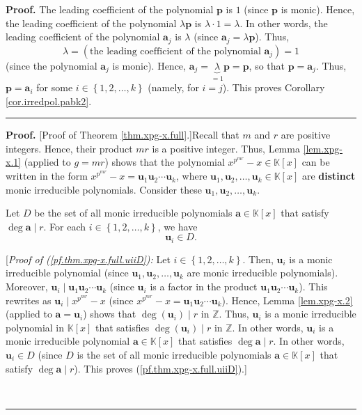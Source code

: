 \documentclass[numbers=enddot,12pt,final,onecolumn,notitlepage]{scrartcl}%
\theoremstyle{definition}
\newenvironment{proof}[1][Proof]{\noindent\textbf{#1.} }{\ \rule{0.5em}{0.5em}}
\begin{document}
\begin{proof}
The leading coefficient of the polynomial $\mathbf{p}$ is $1$ (since
$\mathbf{p}$ is monic). Hence, the leading coefficient of the polynomial
$\lambda\mathbf{p}$ is $\lambda\cdot1=\lambda$. In other words, the leading
coefficient of the polynomial $\mathbf{a}_{j}$ is $\lambda$ (since
$\mathbf{a}_{j}=\lambda\mathbf{p}$). Thus,%
\[
\lambda=\left(  \text{the leading coefficient of the polynomial }%
\mathbf{a}_{j}\right)  =1
\]
(since the polynomial $\mathbf{a}_{j}$ is monic). Hence, $\mathbf{a}%
_{j}=\underbrace{\lambda}_{=1}\mathbf{p}=\mathbf{p}$, so that $\mathbf{p}%
=\mathbf{a}_{j}$. Thus, $\mathbf{p}=\mathbf{a}_{i}$ for some $i\in\left\{
1,2,\ldots,k\right\}  $ (namely, for $i=j$). This proves Corollary
\ref{cor.irredpol.pabk2}.
\end{proof}

\begin{proof}
[Proof of Theorem \ref{thm.xpg-x.full}.]Recall that $m$ and $r$ are positive
integers. Hence, their product $mr$ is a positive integer. Thus, Lemma
\ref{lem.xpg-x.1} (applied to $g=mr$) shows that the polynomial $x^{p^{mr}%
}-x\in\mathbb{K}\left[  x\right]  $ can be written in the form $x^{p^{mr}%
}-x=\mathbf{u}_{1}\mathbf{u}_{2}\cdots\mathbf{u}_{k}$, where $\mathbf{u}%
_{1},\mathbf{u}_{2},\ldots,\mathbf{u}_{k}\in\mathbb{K}\left[  x\right]  $ are
\textbf{distinct} monic irreducible polynomials. Consider these $\mathbf{u}%
_{1},\mathbf{u}_{2},\ldots,\mathbf{u}_{k}$.

Let $D$ be the set of all monic irreducible polynomials $\mathbf{a}%
\in\mathbb{K}\left[  x\right]  $ that satisfy $\deg\mathbf{a}\mid r$. For each
$i\in\left\{  1,2,\ldots,k\right\}  $, we have%
\begin{equation}
\mathbf{u}_{i}\in D. \label{pf.thm.xpg-x.full.uiiD}%
\end{equation}


[\textit{Proof of (\ref{pf.thm.xpg-x.full.uiiD}):} Let $i\in\left\{
1,2,\ldots,k\right\}  $. Then, $\mathbf{u}_{i}$ is a monic irreducible
polynomial (since $\mathbf{u}_{1},\mathbf{u}_{2},\ldots,\mathbf{u}_{k}$ are
monic irreducible polynomials). Moreover, $\mathbf{u}_{i}\mid\mathbf{u}%
_{1}\mathbf{u}_{2}\cdots\mathbf{u}_{k}$ (since $\mathbf{u}_{i}$ is a factor in
the product $\mathbf{u}_{1}\mathbf{u}_{2}\cdots\mathbf{u}_{k}$). This rewrites
as $\mathbf{u}_{i}\mid x^{p^{mr}}-x$ (since $x^{p^{mr}}-x=\mathbf{u}%
_{1}\mathbf{u}_{2}\cdots\mathbf{u}_{k}$). Hence, Lemma \ref{lem.xpg-x.2}
(applied to $\mathbf{a}=\mathbf{u}_{i}$) shows that $\deg\left(
\mathbf{u}_{i}\right)  \mid r$ in $\mathbb{Z}$. Thus, $\mathbf{u}_{i}$ is a
monic irreducible polynomial in $\mathbb{K}\left[  x\right]  $ that satisfies
$\deg\left(  \mathbf{u}_{i}\right)  \mid r$ in $\mathbb{Z}$. In other words,
$\mathbf{u}_{i}$ is a monic irreducible polynomial $\mathbf{a}\in
\mathbb{K}\left[  x\right]  $ that satisfies $\deg\mathbf{a}\mid r$. In other
words, $\mathbf{u}_{i}\in D$ (since $D$ is the set of all monic irreducible
polynomials $\mathbf{a}\in\mathbb{K}\left[  x\right]  $ that satisfy
$\deg\mathbf{a}\mid r$). This proves (\ref{pf.thm.xpg-x.full.uiiD}).]


\end{proof}
\end{document}
